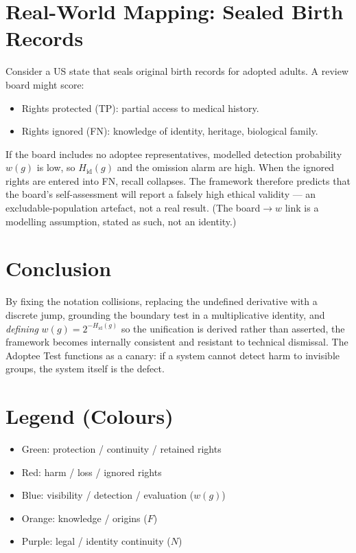 \documentclass[12pt,a4paper]{article}
\newcommand{\cbull}[1]{\textcolor{#1}{\rule[0.1ex]{0.9em}{0.9em}}}
\begin{document}
\section{Real-World Mapping: Sealed Birth Records}
Consider a US state that seals original birth records for adopted adults. A
review board might score:
\begin{itemize}
\item Rights protected (TP): partial access to medical history.
\item Rights ignored (FN): knowledge of identity, heritage, biological family.
\end{itemize}
If the board includes no adoptee representatives, modelled detection
probability $w(g)$ is low, so $H_{\mathrm{id}}(g)$ and the omission alarm are
high. When the ignored rights are entered into FN, recall collapses. The
framework therefore predicts that the board's self-assessment will report a
falsely high ethical validity --- an excludable-population artefact, not a
real result. (The board$\to w$ link is a modelling assumption, stated as such,
not an identity.)

\section{Conclusion}
By fixing the notation collisions, replacing the undefined derivative with a
discrete jump, grounding the boundary test in a multiplicative identity, and
\emph{defining} $w(g)=2^{-H_{\mathrm{id}}(g)}$ so the unification is derived
rather than asserted, the framework becomes internally consistent and
resistant to technical dismissal. The Adoptee Test functions as a canary: if a
system cannot detect harm to invisible groups, the system itself is the defect.

\section*{Legend (Colours)}
\begin{itemize}
\item[\cbull{green!60!black}] Green: protection / continuity / retained rights
\item[\cbull{red!80!black}] Red: harm / loss / ignored rights
\item[\cbull{blue!70!black}] Blue: visibility / detection / evaluation ($w(g)$)
\item[\cbull{orange!85!black}] Orange: knowledge / origins ($F$)
\item[\cbull{violet}] Purple: legal / identity continuity ($N$)
\end{itemize}
\end{document}
